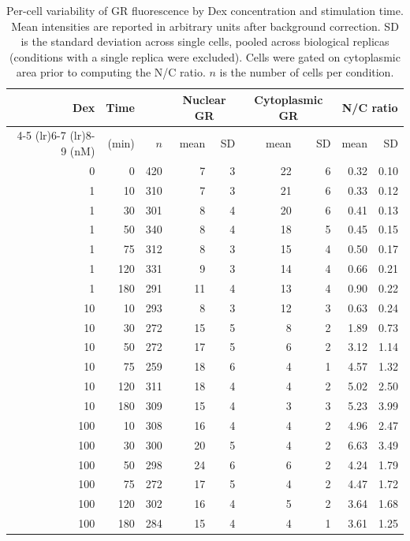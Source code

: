 \begin{table}[h]
\centering
\caption{Per-cell variability of GR fluorescence by Dex concentration and stimulation time. Mean intensities are reported in arbitrary units after background correction. SD is the standard deviation across single cells, pooled across biological replicas (conditions with a single replica were excluded). Cells were gated on cytoplasmic area prior to computing the N/C ratio. $n$ is the number of cells per condition.}
\label{tab:GR_variability}
\begin{tabular}{r r r r r r r r r}
\toprule
Dex & Time & & \multicolumn{2}{c}{Nuclear GR} & \multicolumn{2}{c}{Cytoplasmic GR} & \multicolumn{2}{c}{N/C ratio} \\
\cmidrule(lr){4-5} \cmidrule(lr){6-7} \cmidrule(lr){8-9}
(nM) & (min) & $n$ & mean & SD & mean & SD & mean & SD \\
\midrule
0 & 0 & 420 & 7 & 3 & 22 & 6 & 0.32 & 0.10 \\
1 & 10 & 310 & 7 & 3 & 21 & 6 & 0.33 & 0.12 \\
1 & 30 & 301 & 8 & 4 & 20 & 6 & 0.41 & 0.13 \\
1 & 50 & 340 & 8 & 4 & 18 & 5 & 0.45 & 0.15 \\
1 & 75 & 312 & 8 & 3 & 15 & 4 & 0.50 & 0.17 \\
1 & 120 & 331 & 9 & 3 & 14 & 4 & 0.66 & 0.21 \\
1 & 180 & 291 & 11 & 4 & 13 & 4 & 0.90 & 0.22 \\
10 & 10 & 293 & 8 & 3 & 12 & 3 & 0.63 & 0.24 \\
10 & 30 & 272 & 15 & 5 & 8 & 2 & 1.89 & 0.73 \\
10 & 50 & 272 & 17 & 5 & 6 & 2 & 3.12 & 1.14 \\
10 & 75 & 259 & 18 & 6 & 4 & 1 & 4.57 & 1.32 \\
10 & 120 & 311 & 18 & 4 & 4 & 2 & 5.02 & 2.50 \\
10 & 180 & 309 & 15 & 4 & 3 & 3 & 5.23 & 3.99 \\
100 & 10 & 308 & 16 & 4 & 4 & 2 & 4.96 & 2.47 \\
100 & 30 & 300 & 20 & 5 & 4 & 2 & 6.63 & 3.49 \\
100 & 50 & 298 & 24 & 6 & 6 & 2 & 4.24 & 1.79 \\
100 & 75 & 272 & 17 & 5 & 4 & 2 & 4.47 & 1.72 \\
100 & 120 & 302 & 16 & 4 & 5 & 2 & 3.64 & 1.68 \\
100 & 180 & 284 & 15 & 4 & 4 & 1 & 3.61 & 1.25 \\
\bottomrule
\end{tabular}
\end{table}
